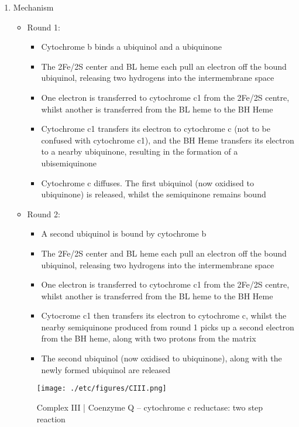 \documentclass{scrartcl}
\begin{document}
\begin{enumerate}
\begin{enumerate}
\item Mechanism
\label{sec:orgf752fb9}
\begin{itemize}
\item Round 1:
\begin{itemize}
\item Cytochrome b binds a ubiquinol and a ubiquinone
\item The 2Fe/2S center and BL heme each pull an electron off the bound ubiquinol, releasing two hydrogens into the intermembrane space
\item One electron is transferred to cytochrome c1 from the 2Fe/2S centre, whilst another is transferred from the BL heme to the BH Heme
\item Cytochrome c1 transfers its electron to cytochrome c (not to be confused with cytochrome c1), and the BH Heme transfers its electron to a nearby ubiquinone, resulting in the formation of a ubisemiquinone
\item Cytochrome c diffuses. The first ubiquinol (now oxidised to ubiquinone) is released, whilst the semiquinone remains bound
\end{itemize}

\item Round 2:
\begin{itemize}
\item A second ubiquinol is bound by cytochrome b
\item The 2Fe/2S center and BL heme each pull an electron off the bound ubiquinol, releasing two hydrogens into the intermembrane space
\item One electron is transferred to cytochrome c1 from the 2Fe/2S centre, whilst another is transferred from the BL heme to the BH Heme
\item Cytocrome c1 then transfers its electron to cytochrome c, whilst the nearby semiquinone produced from round 1 picks up a second electron from the BH heme, along with two protons from the matrix
\item The second ubiquinol (now oxidised to ubiquinone), along with the newly formed ubiquinol are released
\end{itemize}
\end{itemize}

\begin{figure}[htbp]
\centering
\texttt{[image: ./etc/figures/CIII.png]}
\caption[cIII]{\label{fig:org1876717}
Complex III | Coenzyme Q – cytochrome c reductase: two step reaction}
\end{figure}
\end{enumerate}


\end{enumerate}
\end{document}
